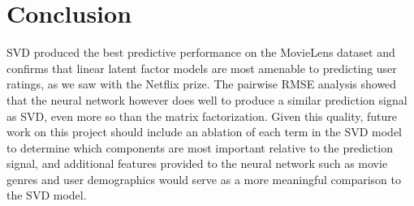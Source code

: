 \section{Conclusion}

SVD produced the best predictive performance on the MovieLens dataset and confirms that linear latent factor models are most amenable to predicting user ratings, as we saw with 
the Netflix prize. The pairwise RMSE analysis showed that the neural network however does well to produce a similar prediction signal as SVD, even more so than the matrix
factorization. Given this quality, future work on this project should include an ablation of each term in the SVD model to determine which components are most important relative to
the prediction signal, and additional features provided to the neural network such as movie genres and user demographics would serve as a more meaningful comparison to the SVD model.